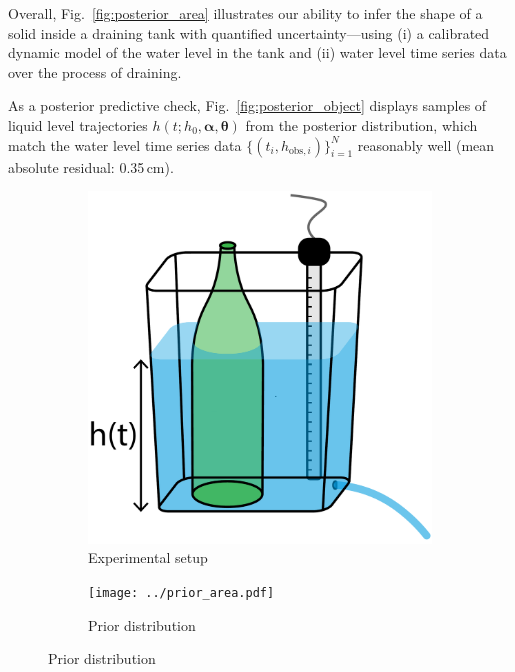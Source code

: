\documentclass[openacc]{rsproca_new}%
\newcommand\thedata {$\{(t_i,h_{\text{obs}, i})\}_{i=1}^{N}$\xspace}
\newcommand\themodel {$h(t; h_0, \boldsymbol \alpha, \boldsymbol\theta)$\xspace}
\begin{document}
Overall, Fig.~\ref{fig:posterior_area} illustrates our ability to infer the shape of a solid inside a draining tank with quantified uncertainty---using (i) a calibrated dynamic model of the water level in the tank and (ii) water level time series data over the process of draining. %

As a posterior predictive check, Fig.~\ref{fig:posterior_object} displays samples of liquid level trajectories \themodel from the posterior distribution, which match the water level time series data \thedata reasonably well (mean absolute residual: 0.35\,cm). 

\begin{figure}[h!]
    \centering
        \begin{subfigure}[b]{0.3\textwidth}
    	\includegraphics[width=\textwidth]{../tank_geometry/tank_w_bottle.pdf}
	\caption{Experimental setup} \label{fig:tank_w_bottle}
    \end{subfigure}
     \begin{subfigure}[b]{0.49\textwidth}
    	\texttt{[image: ../prior\_area.pdf]}
	\caption{Prior distribution} \label{fig:prior_area}
    \end{subfigure}
    

\end{figure}
\end{document}

